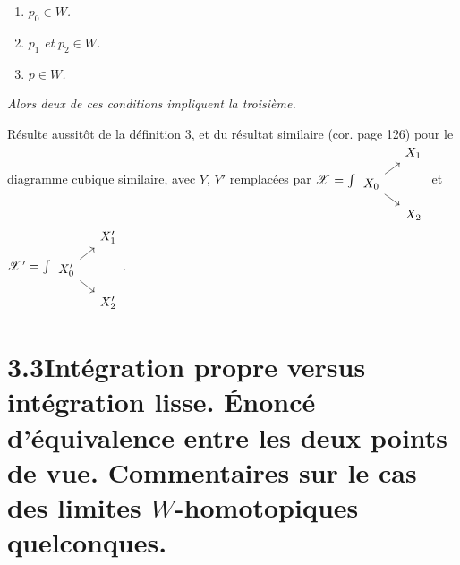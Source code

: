 \documentclass[11pt]{article}
\newcommand{\msp}[1]{\marginpar{\footnotesize [#1]}}
\newcommand{\sX}{\mathscr{X}}
\begin{document}
\msp{page 133}
\begin{enumerate}[label={}]
\item[\textit{a)}] $p_0 \in W$\textit{.}
\item[\textit{b)}] $p_1$ \textit{et} $p_2 \in W$\textit{.}
\item[\textit{c)}] $p \in W$\textit{.}
\end{enumerate}

\textit{Alors deux de ces conditions impliquent la troisième.}

Résulte aussitôt de la définition 3, et du résultat similaire (cor. page 126) pour le diagramme cubique similaire, avec $Y$, $Y'$ remplacées par $\sX = \int
\begin{tikzcd}[row sep=small, column sep=small]
 & X_1 \\
X_0 \arrow[ur] \arrow[dr] & \\
 & X_2
\end{tikzcd}$
et $\sX' = \int
\begin{tikzcd}[row sep=small, column sep=small]
 & X'_1 \\
X'_0 \arrow[ur] \arrow[dr] & \\
 & X'_2
\end{tikzcd}$\;.

\section*{3.3\quad Intégration propre versus intégration lisse. Énoncé d'équivalence entre les deux points de vue. Commentaires sur le cas des limites $W$-homotopiques quelconques.}
\end{document}

